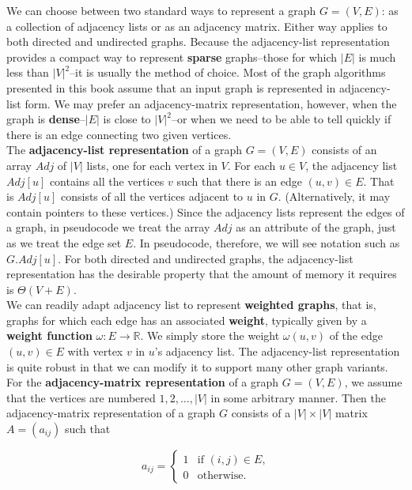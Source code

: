 \documentclass[12pt]{article}
\begin{document}
We can choose between two standard ways to represent a graph $G = (V,E)$: as a collection of adjacency lists or as an adjacency matrix. Either way applies to both directed and undirected graphs. Because the adjacency-list representation provides a compact way to represent \textbf{sparse} graphs--those for which $|E|$ is much less than $|V|^2$--it is usually the method of choice. Most of the graph algorithms presented in this book assume that an input graph is represented in adjacency-list form. We may prefer an adjacency-matrix representation, however, when the graph is \textbf{dense}--$|E|$ is close to $|V|^2$--or when we need to be able to tell quickly if there is an edge connecting two given vertices. \\

The \textbf{adjacency-list representation} of a graph $G = (V,E)$ consists of an array $Adj$ of $|V|$ lists, one for each vertex in $V$. For each $u \in V$, the adjacency list $Adj[u]$ contains all the vertices $v$ such that there is an edge $(u,v) \in E$. That is $Adj[u]$ consists of all the vertices adjacent to $u$ in $G$. (Alternatively, it may contain pointers to these vertices.) Since the adjacency lists represent the edges of a graph, in pseudocode we treat the array $Adj$ as an attribute of the graph, just as we treat the edge set $E$. In pseudocode, therefore, we will see notation such as $G.Adj[u]$. For both directed and undirected graphs, the adjacency-list representation has the desirable property that the amount of memory it requires is $\Theta (V+E)$. \\

We can readily adapt adjacency list to represent \textbf{weighted graphs}, that is, graphs for which each edge has an associated \textbf{weight}, typically given by a \textbf{weight function} $\omega : E \rightarrow \mathbb{
R}$. We simply store the weight $\omega(u,v)$ of the edge $(u,v) \in E$ with vertex $v$ in $u$'s adjacency list. The adjacency-list representation is quite robust in that we can modify it to support many other graph variants. \\

For the \textbf{adjacency-matrix representation} of a graph $G = (V,E)$, we assume that the vertices are numbered $1,2,\dots,|V|$ in some arbitrary manner. Then the adjacency-matrix representation of a graph $G$ consists of a $|V| \times |V|$ matrix $A = (a_{ij})$ such that

\begin{equation*}
  a_{ij} =
  \begin{cases}
    1 & \text{if $(i,j) \in E$,} \\
    0 & \text{otherwise.}
  \end{cases}
\end{equation*}
\end{document}

